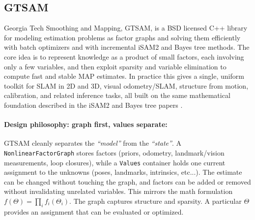 \subsection{GTSAM}
Georgia Tech Smoothing and Mapping, GTSAM, is a BSD licensed C++ library for modeling estimation problems as factor graphs and solving them efficiently with batch optimizers and with incremental iSAM2 and Bayes tree methods. The core idea is to represent knowledge as a product of small factors, each involving only a few variables, and then exploit sparsity and variable elimination to compute fast and stable MAP estimates. In practice this gives a single, uniform toolkit for SLAM in 2D and 3D, visual odometry/SLAM, structure from motion, calibration, and related inference tasks, all built on the same mathematical foundation described in the iSAM2 and Bayes tree papers \cite{GTSAM_handbook,iSAM2_paper,Bayes_tree_for_SLAM_paper}.

\paragraph{Design philosophy: graph first, values separate:}
GTSAM cleanly separates the \textit{``model''} from the \textit{``state''}. A \texttt{NonlinearFactorGraph} stores factors (priors, odometry, landmark/vision measurements, loop closures), while a \texttt{Values} container holds one current assignment to the unknowns (poses, landmarks, intrinsics, etc...). The estimate can be changed without touching the graph, and factors can be added or removed without invalidating unrelated variables. This mirrors the math formulation $f(\Theta)=\prod_i f_i(\Theta_i)$. The graph captures structure and sparsity. A particular $\Theta$ provides an assignment that can be evaluated or optimized. \cite{GTSAM_handbook}

